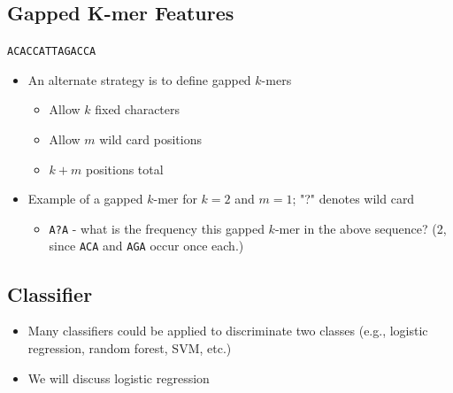 \documentclass[10pt]{article}
\begin{document}
\subsection*{Gapped K-mer Features}
\begin{center}
    \texttt{ACACCATTAGACCA}
\end{center}
\begin{itemize}
	\item An alternate strategy is to define gapped $k$-mers
	\begin{itemize}
        \item Allow $k$ fixed characters
        \item Allow $m$ wild card positions
        \item $k + m$ positions total
    \end{itemize}
    \item Example of a gapped $k$-mer for $k = 2$ and $m = 1$; "?" denotes wild card
    \begin{itemize}
        \item \texttt{A?A} - what is the frequency this gapped $k$-mer in the above sequence?  (2, since \texttt{ACA} and \texttt{AGA} occur once each.)
    \end{itemize}
\end{itemize}

\subsection*{Classifier}
\begin{itemize}
	\item Many classifiers could be applied to discriminate two classes (e.g., logistic regression, random forest, SVM, etc.)
	\item We will discuss logistic regression
\end{itemize}
\end{document}
